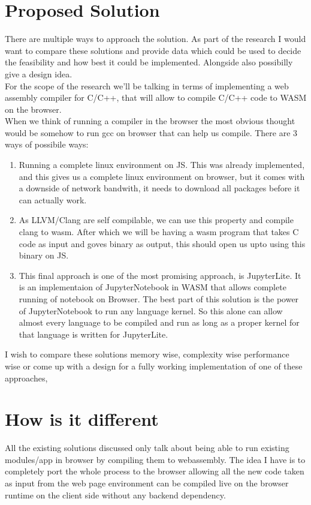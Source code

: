 \documentclass[11pt,letterpaper]{article}
\begin{document}
\section*{Proposed Solution}
There are multiple ways to approach the solution. As part of the research I would want to compare these solutions and provide data which could be used to decide the feasibility and how best it could be implemented. Alongside also possibilly give a design idea. \\
For the scope of the research we'll be talking in terms of implementing a web assembly compiler for C/C++, that will allow to compile C/C++ code to WASM on the browser. \\
When we think of running a compiler in the browser the most obvious thought would be somehow to run gcc on browser that can help us compile. There are 3 ways of possibile ways:
\begin{enumerate}
  \item Running a complete linux environment on JS\cite{JSLinux}. This was already implemented, and this gives us a complete linux environment on browser, but it comes with a downside of network bandwith, it needs to download all packages before it can actually work. 
  \item As LLVM/Clang are self compilable, we can use this property and compile clang to wasm. After which we will be having a wasm program that takes C code as input and goves binary as output, this should open us upto using this binary on JS. 
  \item This final approach is one of the most promising approach, is JupyterLite\cite{JupyterLitea}. It is an implementaion of JupyterNotebook in WASM\cite{tuloupJupyterLiteJupyterWebAssembly2021} that allows complete running of notebook on Browser. The best part of this solution is the power of JupyterNotebook to run any language kernel. So this alone can allow almost every language to be compiled and run as long as a proper kernel for that language is written for JupyterLite.
\end{enumerate}
I wish to compare these solutions memory wise, complexity wise performance wise or come up with a design for a fully working implementation of one of these approaches,

\section*{How is it different}
All the existing solutions discussed only talk about being able to run existing modules/app in browser by compiling them to webassembly. The idea I have is to completely port the whole process to the browser allowing all the new code taken as input from the web page environment can be compiled live on the browser runtime on the client side without any backend dependency.
\end{document}
